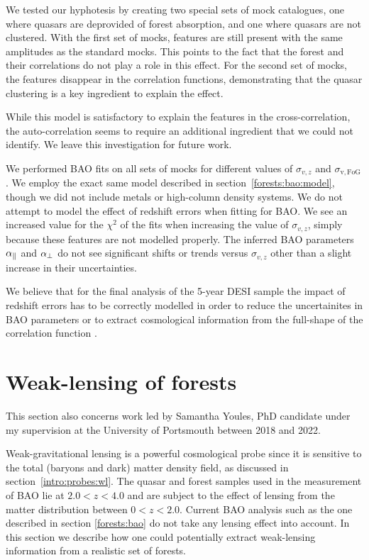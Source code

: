 We tested our hyphotesis by creating two special sets of mock catalogues, one 
where quasars are deprovided of forest absorption, and one where quasars are 
not clustered. With the first set of mocks, features are still present with the 
same amplitudes as the standard mocks. 
This points to the fact that the \lya forest and their correlations do not play 
a role in this effect. 
For the second set of mocks, the features disappear in the correlation functions, 
demonstrating that the quasar clustering is a key ingredient to explain the effect. 

While this model is satisfactory to explain the features in the cross-correlation, 
the auto-correlation seems to require an additional ingredient that we could not 
identify. We leave this investigation for future work. 

We performed BAO fits on all sets of mocks for different values of 
$\sigma_{v, z}$ and $\sigma_\mathrm{v, FoG}$. We employ the exact same model 
described in section~\ref{forests:bao:model}, though we did not include 
metals or high-column density systems. We do not attempt to model 
the effect of redshift errors when fitting for BAO. 
We see an increased value for the $\chi^2$ of the fits when increasing 
the value of $\sigma_{v, z}$, simply because these features are not modelled
properly. The inferred BAO parameters ${\alpha_\parallel}$ and ${\alpha_\perp}$ do not see 
significant shifts or trends versus $\sigma_{v, z}$ other than a slight increase 
in their uncertainties. 

We believe that for the final analysis of the 5-year DESI sample the impact 
of redshift errors has to be correctly modelled in order to reduce the 
uncertainites in BAO parameters or to extract cosmological information from  
the full-shape of the correlation function \cite{cuceuCosmologyBAO3D2021}.

\section{Weak-lensing of forests}
\label{forests:lensing}

This section also concerns work led by Samantha Youles, PhD candidate under 
my supervision at the University of Portsmouth between 2018 and 2022. 

Weak-gravitational lensing is a powerful cosmological probe since it is 
sensitive to the total (baryons and dark) matter density field, as 
discussed in section~\ref{intro:probes:wl}. The quasar and \lya forest 
samples used in the measurement of BAO lie at $2.0 < z < 4.0$ and are 
subject to the effect of lensing from the matter distribution between 
$0 < z < 2.0$. Current BAO analysis such as the one described in section
\ref{forests:bao} do not take any lensing effect into account. 
In this section we describe how one could potentially extract weak-lensing 
information from a realistic set of \lya forests. 


